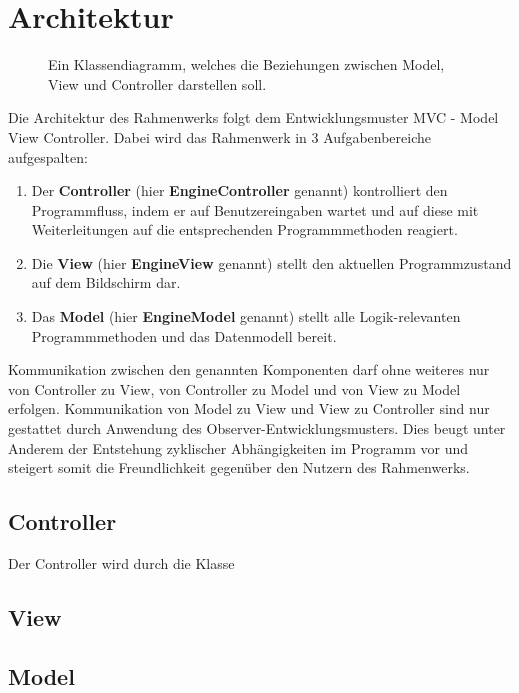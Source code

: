 \section{Architektur}

\begin{figure}[ht!]
	\centering
	\begin{center}
	\end{center}
     \caption{Ein Klassendiagramm, welches die Beziehungen zwischen Model, View und Controller darstellen soll.}
     \label{fig:class_diagram:mvc}
\end{figure}

Die Architektur des Rahmenwerks folgt dem Entwicklungsmuster MVC - Model View Controller. Dabei wird das Rahmenwerk in 3 Aufgabenbereiche aufgespalten:
\begin{enumerate}
\item Der \textbf{Controller} (hier \textbf{EngineController} genannt) kontrolliert den Programmfluss, indem er auf Benutzereingaben wartet und auf diese mit  Weiterleitungen auf die entsprechenden Programmmethoden reagiert.
\item Die \textbf{View} (hier \textbf{EngineView} genannt) stellt den aktuellen Programmzustand auf dem Bildschirm dar.
\item Das \textbf{Model} (hier \textbf{EngineModel} genannt) stellt alle Logik-relevanten Programmmethoden und das Datenmodell bereit.
\end{enumerate}
Kommunikation zwischen den genannten Komponenten darf ohne weiteres nur von Controller zu View, von Controller zu Model und von View zu Model erfolgen.
Kommunikation von Model zu View und View zu Controller sind nur gestattet durch Anwendung des Observer-Entwicklungsmusters. Dies beugt unter Anderem der Entstehung zyklischer Abhängigkeiten im Programm vor und steigert somit die Freundlichkeit gegenüber den Nutzern des Rahmenwerks.

\subsection{Controller}

Der Controller wird durch die Klasse 

\subsection{View}

\subsection{Model}